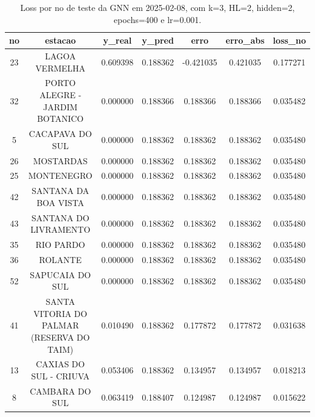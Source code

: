 \begin{table}[h]
\centering
\caption{Loss por no de teste da GNN em 2025-02-08, com k=3, HL=2, hidden=2, epochs=400 e lr=0.001.}
\label{tab:gnn_loss_k3_hl2_h2_e400_d20250208}
\begin{tabular}{ccccccc}
\toprule
no & estacao & y\_real & y\_pred & erro & erro\_abs & loss\_no \\
\midrule
23 & LAGOA VERMELHA & 0.609398 & 0.188362 & -0.421035 & 0.421035 & 0.177271 \\
32 & PORTO ALEGRE - JARDIM BOTANICO & 0.000000 & 0.188366 & 0.188366 & 0.188366 & 0.035482 \\
5 & CACAPAVA DO SUL & 0.000000 & 0.188362 & 0.188362 & 0.188362 & 0.035480 \\
26 & MOSTARDAS & 0.000000 & 0.188362 & 0.188362 & 0.188362 & 0.035480 \\
25 & MONTENEGRO & 0.000000 & 0.188362 & 0.188362 & 0.188362 & 0.035480 \\
42 & SANTANA DA BOA VISTA & 0.000000 & 0.188362 & 0.188362 & 0.188362 & 0.035480 \\
43 & SANTANA DO LIVRAMENTO & 0.000000 & 0.188362 & 0.188362 & 0.188362 & 0.035480 \\
35 & RIO PARDO & 0.000000 & 0.188362 & 0.188362 & 0.188362 & 0.035480 \\
36 & ROLANTE & 0.000000 & 0.188362 & 0.188362 & 0.188362 & 0.035480 \\
52 & SAPUCAIA DO SUL & 0.000000 & 0.188362 & 0.188362 & 0.188362 & 0.035480 \\
41 & SANTA VITORIA DO PALMAR (RESERVA DO TAIM) & 0.010490 & 0.188362 & 0.177872 & 0.177872 & 0.031638 \\
13 & CAXIAS DO SUL - CRIUVA & 0.053406 & 0.188362 & 0.134957 & 0.134957 & 0.018213 \\
8 & CAMBARA DO SUL & 0.063419 & 0.188407 & 0.124987 & 0.124987 & 0.015622 \\
\bottomrule
\end{tabular}
\end{table}
